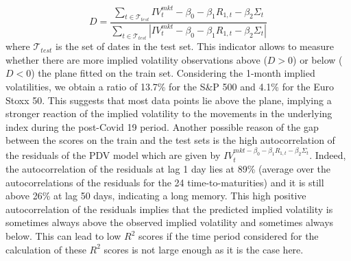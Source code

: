 \begin{equation}
    D = \frac{\displaystyle\sum_{t\in \mathcal{T}_{test}} IV_t^{mkt} -\beta_0-\beta_1R_{1,t}-\beta_2\Sigma_t }{\displaystyle\sum_{t\in \mathcal{T}_{test}} \left| IV_t^{mkt} -\beta_0-\beta_1R_{1,t}-\beta_2\Sigma_t \right|}
\end{equation}
where $\mathcal{T}_{test}$ is the set of dates in the test set. This indicator allows to measure whether there are more implied volatility observations above ($D>0$) or below ($D<0$) the plane fitted on the train set. Considering the 1-month implied volatilities, we obtain a ratio of 13.7\% for the S\&P 500 and 4.1\% for the Euro Stoxx 50. This suggests that most data points lie above the plane, implying a stronger reaction of the implied volatility to the movements in the underlying index during the post-Covid 19 period. Another possible reason of the gap between the scores on the train and the test sets is the high autocorrelation of the residuals of the PDV model which are given by $IV_t^{mkt-\beta_0-\beta_1R_{1,t}-\beta_2\Sigma_t}$. Indeed, the autocorrelation of the residuals at lag 1 day lies at 89\% (average over the autocorrelations of the residuals for the 24 time-to-maturities) and it is still above 26\% at lag 50 days, indicating a long memory. This high positive autocorrelation of the residuals implies that the predicted implied volatility is sometimes always above the observed implied volatility and sometimes always below. This can lead to low $R^2$ scores if the time period considered for the calculation of these $R^2$ scores is not large enough as it is the case here.



